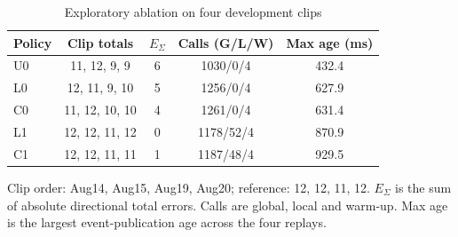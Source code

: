 \begin{table}[!t]
\caption{Exploratory ablation on four development clips}
\label{tab:p0ablation}
\centering\small
\begin{tabular}{@{}lcccc@{}}
\toprule
Policy & Clip totals & $E_\Sigma$ & Calls (G/L/W) & Max age (ms)\\
\midrule
U0 & 11, 12, 9, 9 & 6 & 1030/0/4 & 432.4\\
L0 & 12, 11, 9, 10 & 5 & 1256/0/4 & 627.9\\
C0 & 11, 12, 10, 10 & 4 & 1261/0/4 & 631.4\\
L1 & 12, 12, 11, 12 & 0 & 1178/52/4 & 870.9\\
C1 & 12, 12, 11, 11 & 1 & 1187/48/4 & 929.5\\
\bottomrule
\end{tabular}
\par\smallskip\parbox{0.97\columnwidth}{\footnotesize Clip order: Aug14, Aug15, Aug19, Aug20; reference: 12, 12, 11, 12. $E_\Sigma$ is the sum of absolute directional total errors. Calls are global, local and warm-up. Max age is the largest event-publication age across the four replays.}
\end{table}
